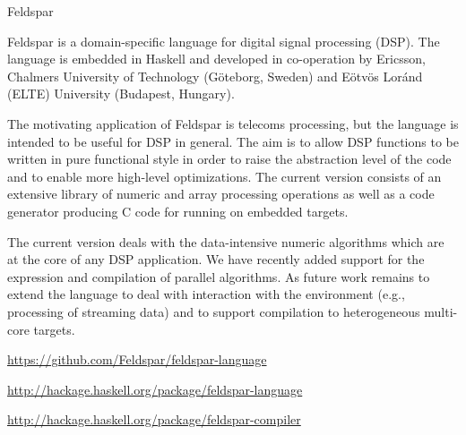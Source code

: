 \begin{hcarentry}{Feldspar}
\label{feldspar}
\makeheader

Feldspar is a domain-specific language for digital signal processing (DSP). The
language is embedded in Haskell and developed in co-operation by Ericsson,
Chalmers University of Technology (G\"oteborg, Sweden) and E\"otv\"os Lor\'and
(ELTE) University (Budapest, Hungary).

The motivating application of Feldspar is telecoms processing, but the language
is intended to be useful for DSP in general. The aim is to allow DSP functions
to be written in pure functional style in order to raise the abstraction level of
the code and to enable more high-level optimizations. The current version consists
of an extensive library of numeric and array processing operations as well as a
code generator producing C code for running on embedded targets.

The current version deals with the data-intensive numeric algorithms which are
at the core of any DSP application. We have recently added support for the expression
and compilation of parallel algorithms. As future work remains to extend the language
to deal with interaction with the environment (e.g., processing of streaming data) and
to support compilation to heterogeneous multi-core targets.

\FurtherReading
\begin{compactitem}
\item \url{https://github.com/Feldspar/feldspar-language}
\item \url{http://hackage.haskell.org/package/feldspar-language}
\item \url{http://hackage.haskell.org/package/feldspar-compiler}
\end{compactitem}
\end{hcarentry}
